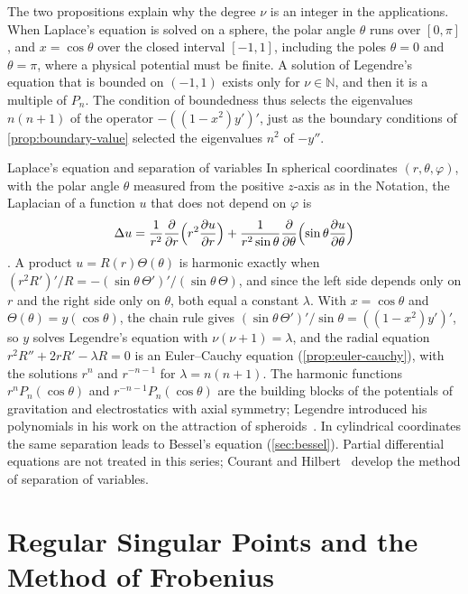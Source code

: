 The two propositions explain why the degree $\nu$ is an integer in the applications. When Laplace's equation is solved on a sphere, the polar angle $\theta$ runs over $[0,\pi]$, and $x=\cos\theta$ over the closed interval $[-1,1]$, including the poles $\theta=0$ and $\theta=\pi$, where a physical potential must be finite. A solution of Legendre's equation that is bounded on $(-1,1)$ exists only for $\nu\in\mathbb N$, and then it is a multiple of $P_n$. The condition of boundedness thus selects the eigenvalues $n(n+1)$ of the operator $-((1-x^2)y')'$, just as the boundary conditions of \cref{prop:boundary-value} selected the eigenvalues $n^2$ of $-y''$.

\begin{note}{Laplace's equation and separation of variables}
In spherical coordinates $(r,\theta,\varphi)$, with the polar angle $\theta$ measured from the positive $z$-axis as in the Notation, the Laplacian of a function $u$ that does not depend on $\varphi$ is
\[
\Delta u=\frac1{r^2}\frac{\partial}{\partial r}\Bigl(r^2\frac{\partial u}{\partial r}\Bigr)+\frac1{r^2\sin\theta}\frac{\partial}{\partial\theta}\Bigl(\sin\theta\frac{\partial u}{\partial\theta}\Bigr)
\]
\cite{courant1953}. A product $u=R(r)\Theta(\theta)$ is harmonic exactly when $(r^2R')'/R=-(\sin\theta\,\Theta')'/(\sin\theta\,\Theta)$, and since the left side depends only on $r$ and the right side only on $\theta$, both equal a constant $\lambda$. With $x=\cos\theta$ and $\Theta(\theta)=y(\cos\theta)$, the chain rule gives $(\sin\theta\,\Theta')'/\sin\theta=((1-x^2)y')'$, so $y$ solves Legendre's equation with $\nu(\nu+1)=\lambda$, and the radial equation $r^2R''+2rR'-\lambda R=0$ is an Euler--Cauchy equation (\cref{prop:euler-cauchy}), with the solutions $r^n$ and $r^{-n-1}$ for $\lambda=n(n+1)$. The harmonic functions $r^nP_n(\cos\theta)$ and $r^{-n-1}P_n(\cos\theta)$ are the building blocks of the potentials of gravitation and electrostatics with axial symmetry; Legendre introduced his polynomials in his work on the attraction of spheroids~\cite{legendre1785}. In cylindrical coordinates the same separation leads to Bessel's equation (\cref{sec:bessel}). Partial differential equations are not treated in this series; Courant and Hilbert~\cite{courant1953} develop the method of separation of variables.
\end{note}

\section{Regular Singular Points and the Method of Frobenius}
\label{sec:frobenius}


